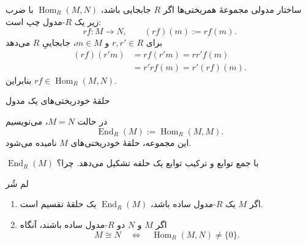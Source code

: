 \begin{frame}[t]{ساختار مدولی مجموعهٔ همریختی‌ها}
    \label{lec07:hom-commutative-action}
    اگر \(R\) جابجایی باشد، \(\operatorname{Hom}_R(M,N)\) با ضرب زیر یک \(R\)-مدول چپ است:
    \[
        rf:M\longrightarrow N,\qquad (rf)(m):=rf(m).
    \]
    برای \(r,r'\in R\) و \(m\in M\)، جابجاییِ \(R\) می‌دهد
    \[
        \begin{aligned}
            (rf)(r'm)&=r f(r'm)=rr'f(m)\\
                     &=r'rf(m)=r'(rf)(m).
        \end{aligned}
    \]
    بنابراین \(rf\in\operatorname{Hom}_R(M,N)\).
\end{frame}

\begin{frame}[t]{حلقهٔ خودریختی‌های یک مدول}
    \label{lec07:endomorphism-ring}
    \begin{definition}
        در حالت \(M=N\)، می‌نویسیم
        \[
            \operatorname{End}_R(M):=\operatorname{Hom}_R(M,M).
        \]
        این مجموعه، حلقهٔ خودریختی‌های \(M\) نامیده می‌شود.
    \end{definition}
    \begin{remark}
        \(\operatorname{End}_R(M)\) با جمع توابع و ترکیب توابع یک حلقه تشکیل می‌دهد. \alert{چرا؟}
    \end{remark}
\end{frame}

\begin{frame}[t]{لم شُر}
    \label{lec07:schur-lemma}
    \begin{lemma}[لم شُر]
        \begin{enumerate}
            \item اگر \(M\) یک \(R\)-مدول ساده باشد، \(\operatorname{End}_R(M)\) یک حلقهٔ تقسیم است.
            \item اگر \(M\) و \(N\) دو \(R\)-مدول ساده باشند، آنگاه
            \[
                M\cong N\quad\Longleftrightarrow\quad
                \operatorname{Hom}_R(M,N)\ne\{0\}.
            \]
        \end{enumerate}
    \end{lemma}
\end{frame}

